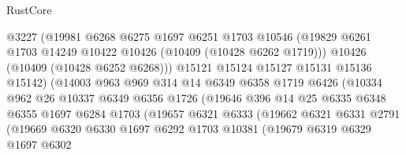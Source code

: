 \begin{lexlean}{RustCore}
\begin{coremodule}
                            @3227
                            (@19981
                              @6268
                              @6275
                              @1697
                              @6251
                              @1703
                              @10546
                              (@19829
                                @6261
                                @1703
                                @14249
                                @10422
                                @10426
                                (@10409 (@10428 @6262 @1719)))
                              @10426
                              (@10409 (@10428 @6252 @6268)))
                            @15121
                            @15124
                            @15127
                            @15131
                            @15136
                            @15142)
                          (@14003
                            @963
                            @969
                            @314
                            @14
                            @6349
                            @6358
                            @1719
                            @6426
                            (@10334
                              @962
                              @26
                              @10337
                              @6349
                              @6356
                              @1726
                              (@19646
                                @396
                                @14
                                @25
                                @6335
                                @6348
                                @6355
                                @1697
                                @6284
                                @1703
                                (@19657
                                  @6321
                                  @6333
                                  (@19662
                                    @6321
                                    @6331
                                    @2791
                                    (@19669
                                      @6320
                                      @6330
                                      @1697
                                      @6292
                                      @1703
                                      @10381
                                      (@19679
                                        @6319
                                        @6329
                                        @1697
                                        @6302

\end{coremodule}
\end{lexlean}
